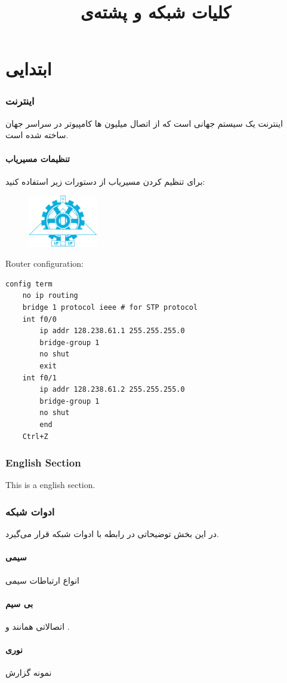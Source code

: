 \documentclass{../UTNetLabFa}
\title{کلیات شبکه و پشته‌ی \textLR{TCP-IP}}
\begin{document}
	

\part{ابتدایی}
    \section{اینترنت}
    اینترنت یک سیستم جهانی است که از اتصال میلیون ها کامپیوتر در سراسر جهان ساخته شده است.
\subsection{تنظیمات مسیریاب}
    برای تنظیم کردن مسیریاب از دستورات زیر استفاده کنید:

    \begin{figure}[h]
    	\centering
        {\includegraphics[height=64pt]{../img/fanni}}
    \end{figure}

{
    Router configuration:
        \begin{lstlisting}[language={cisco}]
config term
    no ip routing
    bridge 1 protocol ieee # for STP protocol
    int f0/0
        ip addr 128.238.61.1 255.255.255.0
        bridge-group 1
        no shut
        exit
    int f0/1
        ip addr 128.238.61.2 255.255.255.0
        bridge-group 1
        no shut
        end
    Ctrl+Z
    \end{lstlisting}
}

\begin{otherlanguage}{english}
	\section{English Section}
	This is a english section.
\end{otherlanguage}

\section{ادوات شبکه}
در این بخش توضیحاتی در رابطه با ادوات شبکه قرار می‌گیرد.
\subsection{سیمی}
انواع ارتباطات سیمی

\subsection{بی سیم}
	اتصالاتی همانند  و .
\subsection{نوری}
\begin{report}
\item نمونه گزارش
\end{report}
\end{document}
